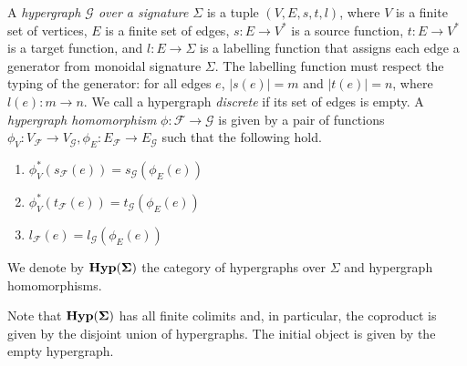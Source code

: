 \begin{definition}\label{def:hypergraph}
A \emph{hypergraph $\mathcal{G}$ over a signature $\Sigma$} is a tuple $(V,E,s,t,l)$,  where $V$ is a finite set of vertices, $E$ is a finite set of edges, $s : E \to V^{*}$ is a source function, $t : E \to V^{*}$ is a target function,  and $l : E \to \Sigma$ is a labelling function that assigns each edge a generator from monoidal signature $\Sigma$.  The labelling function must respect the typing of the generator: for all edges $e$,  $|s(e)| = m$ and $|t(e)| = n$,  where $l(e) : m \to n$.  We call a hypergraph \textit{discrete} if its set of edges is empty.   
A \emph{hypergraph homomorphism} $\phi: \mathcal{F} \to \mathcal{G}$ is given by a pair of functions $\phi_V : V_{\mathcal{F}} \to V_{\mathcal{G}}, \phi_E : E_{\mathcal{F}} \to E_{\mathcal{G}}$ such that the following hold. 
\begin{enumerate}
    \item $\phi_V^*(s_{\mathcal{F}}(e)) = s_{\mathcal{G}}(\phi_E(e))$
    \item $\phi_V^*(t_{\mathcal{F}}(e)) = t_{\mathcal{G}}(\phi_E(e))$
    \item $l_{\mathcal{F}}(e) = l_{\mathcal{G}}(\phi_E(e))$
\end{enumerate}
We denote by $\mathbf{Hyp(\Sigma)}$ the category of hypergraphs over $\Sigma$ and hypergraph homomorphisms. 
\end{definition}
Note that $\mathbf{Hyp(\Sigma)}$ has all finite colimits and, in particular,  the coproduct is given by the disjoint union of hypergraphs.
The initial object is given by the empty hypergraph.  

